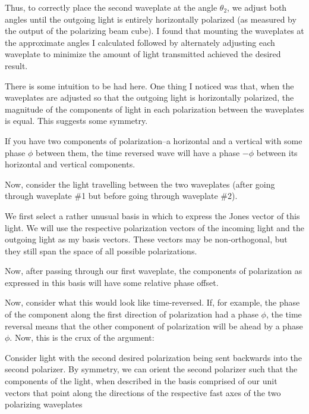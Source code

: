 Thus, to correctly place the second waveplate at the angle  $\theta_2$, we adjust both angles until the outgoing light is entirely horizontally polarized (as measured by the output of the polarizing beam cube). I found that mounting the waveplates at the approximate angles I calculated followed by alternately adjusting each waveplate to minimize the amount of light transmitted achieved the desired result. 

There is some intuition to be had here. One thing I noticed was that, when the waveplates are adjusted so that the outgoing light is horizontally polarized, the magnitude of the components of light in each polarization between the waveplates is equal. This suggests some symmetry. 


If you have two components of polarization--a horizontal and a vertical with some phase $\phi$ between them, the time reversed wave will have a phase $-\phi$ between its horizontal and vertical components. 

Now, consider the light travelling between the two waveplates (after going through waveplate \#1 but before going through waveplate \#2). 

We first select a rather unusual basis in which to express the Jones vector of this light. We will use the respective polarization vectors of the incoming light and the outgoing light as my basis vectors. These vectors may be non-orthogonal, but they still span the space of all possible polarizations.  

Now, after passing through our first waveplate, the components of polarization as expressed in this basis will have some relative phase offset. 

Now, consider what this would look like time-reversed. If, for example, the phase of the component along the first direction of polarization had a phase $\phi$, the time reversal means that the other component of polarization will be ahead by a phase $\phi$. Now, this is the crux of the argument: 

Consider light with the second desired polarization being sent backwards into the second polarizer. By symmetry, we can orient the second polarizer such that the components of the light, when described in the basis comprised of our unit vectors that point along the directions of the respective fast axes of the two polarizing waveplates 



